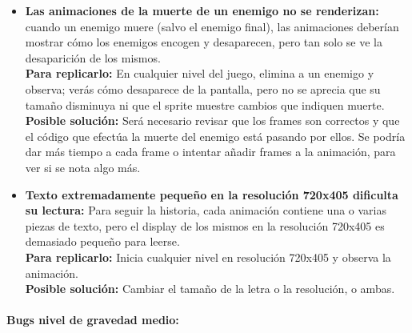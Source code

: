 \documentclass[12pt,a4paper,twoside,spanish]{article}      %
\begin{document}
\begin{itemize}
    \item \textbf{Las animaciones de la muerte de un enemigo no se renderizan:} cuando un enemigo muere (salvo el enemigo final), las animaciones deberían mostrar cómo los enemigos encogen y desaparecen, pero tan solo se ve la desaparición de los mismos.\\[1mm]
    \textbf{Para replicarlo:} En cualquier nivel del juego, elimina a un enemigo y observa; verás cómo desaparece de la pantalla, pero no se aprecia que su tamaño disminuya ni que el sprite muestre cambios que indiquen muerte.\\[1mm]
    \textbf{Posible solución:} Será necesario revisar que los frames son correctos y que el código que efectúa la muerte del enemigo está pasando por ellos. Se podría dar más tiempo a cada frame o intentar añadir frames a la animación, para ver si se nota algo más.
    
    \item \textbf{Texto extremadamente pequeño en la resolución 720x405 dificulta su lectura:} Para seguir la historia, cada animación contiene una o varias piezas de texto, pero el display de los mismos en la resolución 720x405 es demasiado pequeño para leerse.\\[1mm]
    \textbf{Para replicarlo:} Inicia cualquier nivel en resolución 720x405 y observa la animación.\\[1mm]
    \textbf{Posible solución:} Cambiar el tamaño de la letra o la resolución, o ambas.
\end{itemize}

\bigskip

\paragraph*{Bugs nivel de gravedad medio:}
\end{document}
